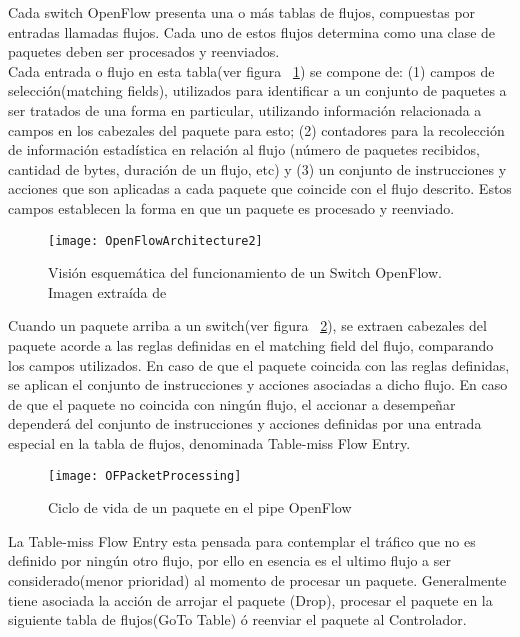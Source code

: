 Cada switch OpenFlow presenta una o m\'as tablas de flujos, compuestas por entradas llamadas flujos. Cada uno de estos flujos determina como una clase de paquetes deben ser procesados y reenviados.\\

Cada entrada o flujo en esta tabla(ver figura ~\ref{fig:OpenFlowArch2}) se compone de: (1) campos de selección(matching fields), utilizados para identificar a un conjunto de paquetes a ser tratados de una forma en particular, utilizando información relacionada a campos en los cabezales del paquete para esto; (2) contadores para la recolección de información estadística en relación al flujo (n\'umero de paquetes recibidos, cantidad de bytes, duración de un flujo, etc) y (3) un conjunto de instrucciones y acciones que son aplicadas a cada paquete que coincide con el flujo descrito. Estos campos establecen la forma en que un paquete es procesado y reenviado.
 
\begin{figure}[htbp!] 
\centering    
\texttt{[image: OpenFlowArchitecture2]}
\caption[Visión esquemática del funcionamiento de un Switch OpenFlow]{Visión esquemática del funcionamiento de un Switch OpenFlow. Imagen extraída de \cite{mckeown2008openflow}}
\label{fig:OpenFlowArch2}
\end{figure}

Cuando un paquete arriba a un switch(ver figura ~\ref{fig:OFPacketProcessing}), se extraen cabezales del paquete acorde a las reglas definidas en el matching field del flujo, comparando los campos utilizados. En caso de que el paquete coincida con las reglas definidas, se aplican el conjunto de instrucciones y acciones asociadas a dicho flujo. En caso de que el paquete no coincida con ningún flujo, el accionar a desempeñar dependerá del conjunto de instrucciones y acciones definidas por una entrada especial en la tabla de flujos, denominada Table-miss Flow Entry.\\ 

\begin{figure}[htbp!] 
\centering    
\texttt{[image: OFPacketProcessing]}
\caption[Ciclo de vida de un paquete en pipe OpenFlow]{Ciclo de vida de un paquete en el pipe OpenFlow}
\label{fig:OFPacketProcessing}
\end{figure}


La Table-miss Flow Entry esta pensada para contemplar el tr\'afico que no es definido por ningún otro flujo, por ello en esencia es el ultimo flujo a ser considerado(menor prioridad) al momento de procesar un paquete. Generalmente tiene asociada la acción de arrojar el paquete (Drop), procesar el paquete en la siguiente tabla de flujos(GoTo Table) \'o reenviar el paquete al Controlador.\\


